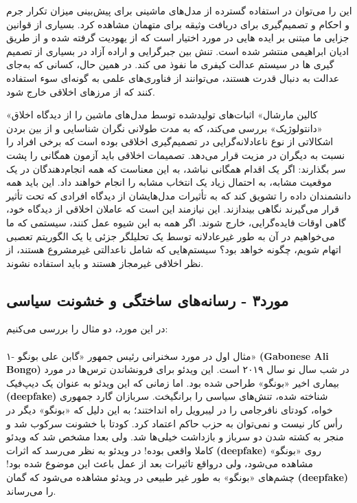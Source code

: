 \documentclass[12pt,oneside]{book}
\begin{document}
    این را می‌توان در استفاده گسترده از مدل‌های ماشینی برای پیش‌بینی میزان تکرار جرم و احکام و تصمیم‌گیری برای دریافت وثیقه برای متهمان مشاهده کرد.
    بسیاری از قوانین جزایی ما مبتنی بر ایده هایی در مورد اختیار است که از یهودیت گرفته شده و از طریق ادیان ابراهیمی منتشر شده است.
    تنش بین جبرگرایی و اراده آزاد در بسیاری از تصمیم گیری ها در سیستم عدالت کیفری ما نفوذ می کند.
    در همین حال، کسانی که به‌جای عدالت به دنبال قدرت هستند، می‌توانند از فناوری‌های علمی به گونه‌ای سوء استفاده کنند که از مرزهای اخلاقی خارج شود.

    «کالین مارشال» اثبات‌های تولیدشده توسط مدل‌های ماشین را از دیدگاه اخلاق «دانتولوژیک» بررسی می‌کند، که به مدت طولانی نگران شناسایی و از بین بردن اشکالاتی از نوع ناعادلانه‌گرایی در تصمیم‌گیری اخلاقی بوده است که برخی افراد را نسبت به دیگران در مزیت قرار می‌دهد.
    تصمیمات اخلاقی باید آزمون همگانی را پشت سر بگذارند: اگر یک اقدام همگانی نباشد، به این معناست که همه انجام‌دهندگان در یک موقعیت مشابه، به احتمال زیاد یک انتخاب مشابه را انجام خواهند داد.
    این باید همه دانشمندان داده را تشویق کند که به تأثیرات مدل‌هایشان از دیدگاه افرادی که تحت تأثیر قرار می‌گیرند نگاهی بیندازند.
    این نیازمند این است که عاملان اخلاقی از دیدگاه خود، گاهی اوقات فایده‌گرایی، خارج شوند.
    اگر همه به این شیوه عمل کنند، سیستمی که ما می‌خواهیم در آن به طور غیرعادلانه توسط یک تحلیلگر جزئی یا یک الگوریتم تعصبی اتهام شویم، چگونه خواهد بود؟ سیستم‌هایی که شامل ناعدالتی غیرمشروع هستند، از نظر اخلاقی غیرمجاز هستند و باید استفاده نشوند.

    \subsection*{مورد۳ - رسانه‌های ساختگی و خشونت سیاسی}
    در این مورد، دو مثال را بررسی می‌کنیم:

    \paragraph{}
    ۱- مثال اول در مورد سخنرانی رئیس جمهور «گابن علی بونگو» \textenglish{\textbf{(Gabonese Ali Bongo)}} در شب سال نو سال ۲۰۱۹ است.
    این ویدئو برای فرونشاندن ترس‌ها در مورد بیماری اخیر «بونگو» طراحی شده بود.
    اما زمانی که این ویدئو به عنوان یک دیپ‌فیک \textenglish{\textbf{(deepfake)}} شناخته شده، تنش‌های سیاسی را برانگیخت.
    سربازان گارد جمهوری خواه، کودتای نافرجامی را در لیبرویل راه انداختند؛ به این دلیل که «بونگو» دیگر در رأس کار نیست و نمی‌توان به حزب حاکم اعتماد کرد.
    کودتا با خشونت سرکوب شد و منجر به کشته شدن دو سرباز و بازداشت خیلی‌ها شد.
    ولی بعدا مشخص شد که ویدئو کاملا واقعی بوده!
    در ویدئو به نظر می‌رسد که اثرات \textenglish{\textbf{(deepfake)}} روی «بونگو» مشاهده می‌شود، ولی درواقع تاثیرات بعد از عمل باعث این موضوع شده بود!
    چشم‌های «بونگو» به طور غیر طبیعی در ویدئو مشاهده می‌شود که گمان \textenglish{\textbf{(deepfake)}} را می‌رساند.
\end{document}
